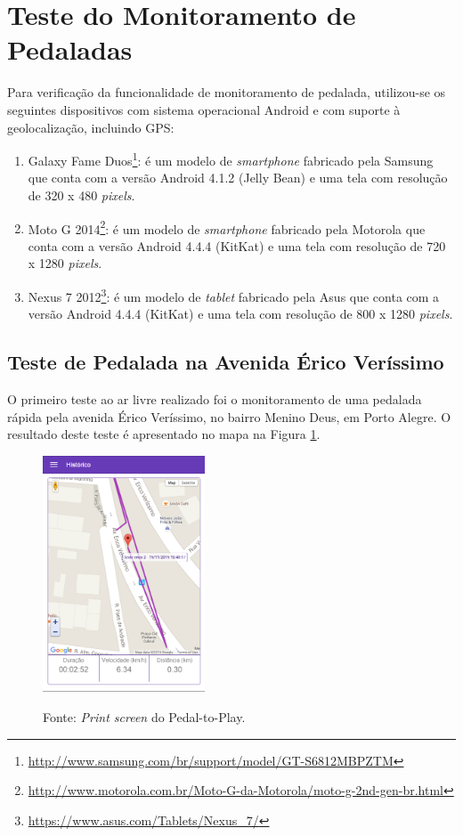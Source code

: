 \section{Teste do Monitoramento de Pedaladas}
Para verificação da funcionalidade de monitoramento de pedalada, utilizou-se os seguintes dispositivos com sistema operacional Android e com suporte à geolocalização, incluindo GPS:

\begin{enumerate}
\item Galaxy Fame Duos\footnote{\url{http://www.samsung.com/br/support/model/GT-S6812MBPZTM}}: é um modelo de \textit{smartphone} fabricado pela Samsung que conta com a versão Android 4.1.2 (Jelly Bean) e uma tela com resolução de 320 x 480 \textit{pixels}.

\item Moto G 2014\footnote{\url{http://www.motorola.com.br/Moto-G-da-Motorola/moto-g-2nd-gen-br.html}}: é um modelo de \textit{smartphone} fabricado pela Motorola que conta com a versão Android 4.4.4 (KitKat) e uma tela com resolução de 720 x 1280 \textit{pixels}.

\item Nexus 7 2012\footnote{\url{https://www.asus.com/Tablets/Nexus_7/}}: é um modelo de \textit{tablet} fabricado pela Asus que conta com a versão Android 4.4.4 (KitKat) e uma tela com resolução de 800 x 1280 \textit{pixels}.
\end{enumerate}

\subsection{Teste de Pedalada na Avenida Érico Veríssimo}
O primeiro teste ao ar livre realizado foi o monitoramento de uma pedalada rápida pela avenida Érico Veríssimo, no bairro Menino Deus, em Porto Alegre. O resultado deste teste é apresentado no mapa na Figura \ref{fig:trackErico}.

\begin{figure}[h]
\begin{minipage}{1.0\textwidth}
    \centerline{\includegraphics[width=13em]{figuras/p2pTrackErico.png}}
    \label{fig:trackErico}
\end{minipage}
\centerline{Fonte: \textit{Print screen} do Pedal-to-Play.}
\end{figure}

